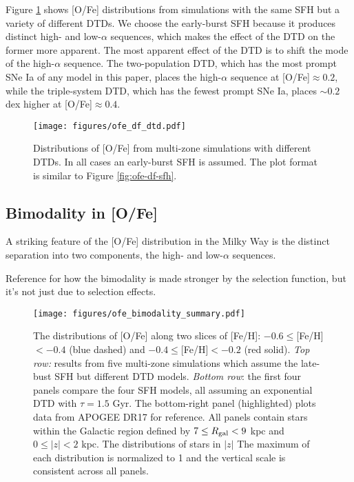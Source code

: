 \documentclass[twocolumn,twocolappendix,linenumbers]{aastex631}
\begin{document}
Figure \ref{fig:ofe-df-dtd} shows [O/Fe] distributions from simulations with the same SFH but a variety of different DTDs. We choose the early-burst SFH because it produces distinct high- and low-$\alpha$ sequences, which makes the effect of the DTD on the former more apparent. The most apparent effect of the DTD is to shift the mode of the high-$\alpha$ sequence. The two-population DTD, which has the most prompt SNe Ia of any model in this paper, places the high-$\alpha$ sequence at [O/Fe]$\approx 0.2$, while the triple-system DTD, which has the fewest prompt SNe Ia, places $\sim0.2$ dex higher at [O/Fe]$\approx0.4$.

\begin{figure*}
    \centering
    \texttt{[image: figures/ofe\_df\_dtd.pdf]}
    \caption{Distributions of [O/Fe] from multi-zone simulations with different DTDs. In all cases an early-burst SFH is assumed. The plot format is similar to Figure \ref{fig:ofe-df-sfh}.}
    \label{fig:ofe-df-dtd}
\end{figure*}

\subsection{Bimodality in [O/Fe]}
\label{sec:bimodality}

A striking feature of the [O/Fe] distribution in the Milky Way is the distinct separation into two components, the high- and low-$\alpha$ sequences. 

Reference \citet{Vincenzo2021-AlphaDistribution} for how the bimodality is made stronger by the selection function, but it's not just due to selection effects.

\begin{figure*}
    \centering
    \texttt{[image: figures/ofe\_bimodality\_summary.pdf]}
    \caption{The distributions of [O/Fe] along two slices of [Fe/H]: $-0.6\leq$[Fe/H]$<-0.4$ (blue dashed) and $-0.4\leq$[Fe/H]$<-0.2$ (red solid). \textit{Top row:} results from five multi-zone simulations which assume the late-bust SFH but different DTD models. \textit{Bottom row}: the first four panels compare the four SFH models, all assuming an exponential DTD with $\tau=1.5$ Gyr. The bottom-right panel (highlighted) plots data from APOGEE DR17 for reference. All panels contain stars within the Galactic region defined by $7\leq R_{\rm gal}<9$ kpc and $0\leq|z|<2$ kpc. The distributions of stars in $|z|$ The maximum of each distribution is normalized to 1 and the vertical scale is consistent across all panels.}
    \label{fig:ofe-bimodality}
\end{figure*}
\end{document}
